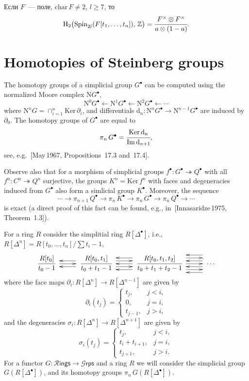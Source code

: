 \documentclass[12pt,a4paper]{article}
\begin{document}
\begin{corollary}
Если $F$~--- поле, $\mathrm{char}\,F\neq2$, $l\geq7$, то
$$
\mathrm H_2\big(\mathrm{Spin}_{2l}(F[t_1,\ldots,t_n]),\,\mathbb Z\big)=\cfrac{F^\times\otimes F^\times}{a\otimes(1-a)}.
$$
\end{corollary}

\section{Homotopies of Steinberg groups}


The homotopy groups of a simplicial group $G^\bullet$ can be computed using the normalized Moore complex $\mathrm NG^\bullet$,
$$
\mathrm N^0G^\bullet\leftarrow\mathrm N^1G^\bullet\leftarrow\mathrm N^2G^\bullet\leftarrow\cdots
$$
where $\mathrm N^nG=\cap_{i=1}^n\mathrm{Ker}\,\partial_i$, and differentials $\mathrm d_n\colon\mathrm N^{n}G^\bullet\rightarrow\mathrm N^{n-1}G^\bullet$ are induced by $\partial_0$. The homotopy groups of $G^\bullet$ are equal to
$$
\pi_n\,G^\bullet = \cfrac{\mathrm{Ker}\,\mathrm d_n}{\mathrm{Im}\,\mathrm d_{n+1}},
$$
see, e.g.~[May\,1967, Propositions~17.3 and~17.4].

Observe also that for a morphism of simplicial groups $f^\bullet\colon G^\bullet\twoheadrightarrow Q^\bullet$ with all $f^n\colon C^n\twoheadrightarrow Q^n$ surjective, the groups $K^n=\mathrm{Ker}\,f^n$ with faces and degeneracies induced from $G^\bullet$ also form a simlicial group $K^\bullet$. Moreover, the sequence
$$
\cdots\rightarrow\pi_{n+1}\,Q^\bullet\rightarrow\pi_n\,K^\bullet\rightarrow\pi_n\,G^\bullet\rightarrow\pi_n\,Q^\bullet\rightarrow\cdots
$$
is exact (a direct proof of this fact can be found, e.g., in~[Innasaridze\,1975, Theorem~1.3]).

For a ring $R$ consider the simplitial ring $R[\Delta^\bullet]$, i.e., $R[\Delta^n]=R[t_0,\ldots,t_n]/\sum t_i-1$, 
$$
\xymatrix{
\cfrac{R[t_0]}{t_0-1}\ \ar[r]&\ar@<1ex>[l]\ar@<-1ex>[l]\ \cfrac{R[t_0,t_1]}{t_0+t_1-1}\ \ar@<1ex>[r]\ar@<-1ex>[r]&\ar@<2ex>[l]\ar@<-2ex>[l]\ar[l]\ \cfrac{R[t_0,t_1,t_2]}{t_0+t_1+t_2-1}\ \ar[r]\ar@<2ex>[r]\ar@<-2ex>[r]&\ar@<1ex>[l]\ar@<-1ex>[l]\ar@<3ex>[l]\ar@<-3ex>[l]\ \cdots
}
$$
where the face maps $\partial_i\colon R[\Delta^n]\rightarrow R[\Delta^{n-1}]$ are given by 
$$
\partial_i(t_j)=
\begin{cases}
t_j,&j<i,\\
0,&j=i,\\
t_{j-1},&j>i,
\end{cases}
$$ 
and the degeneracies $\sigma_i\colon R[\Delta^n]\rightarrow R[\Delta^{n+1}]$ are given by
$$
\sigma_i(t_j)=
\begin{cases}
t_j,&j<i,\\
t_i+t_{i+1},&j=i,\\
t_{j+1},&j>i.
\end{cases}
$$
For a functor $G\colon\mathcal R\mathsf{ings}\rightarrow\mathcal G\mathsf{rps}$ and a ring $R$ we will consider the simplicial group $G(R[\Delta^\bullet])$, and its homotopy groups $\pi_n\,G(R[\Delta^\bullet])$. 
\end{document}
